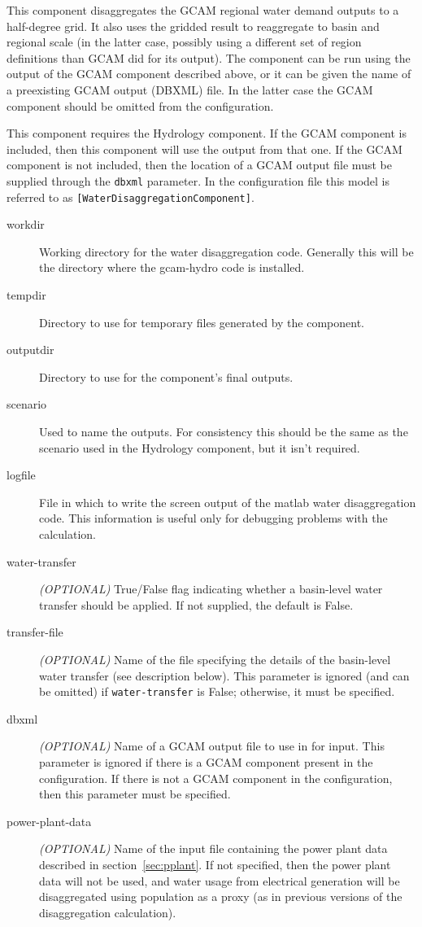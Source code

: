 \documentclass[11pt]{article}
\begin{document}
This component disaggregates the GCAM regional water demand outputs to a
half-degree grid.  It also uses the gridded result to reaggregate to
basin and regional scale (in the latter case, possibly using a
different set of region definitions than GCAM did for its output).
The component can be run using the output of the GCAM component described
above, or it can be given the name of a preexisting GCAM output
(DBXML) file.  In the latter case the GCAM component should be omitted
from the configuration.

This component requires the Hydrology component.  If the GCAM component is
included, then this component will use the output from that one.  If the
GCAM component is not included, then the location of a GCAM output file
must be supplied through the \texttt{dbxml} parameter.  In the
configuration file this model is referred to as
\texttt{[WaterDisaggregationComponent]}.

\begin{description}
\item[workdir] Working directory for the water disaggregation code.
  Generally this will be the directory where the gcam-hydro code is
  installed.
\item[tempdir] Directory to use for temporary files generated by the
  component.
\item[outputdir] Directory to use for the component's final outputs.
\item[scenario] Used to name the outputs.  For consistency this should
  be the same as the scenario used in the Hydrology component, but it
  isn't required.
\item[logfile] File in which to write the screen output of the matlab
  water disaggregation code.  This information is useful only for
  debugging problems with the calculation.
\item[water-transfer] \emph{(OPTIONAL)} True/False flag indicating
  whether a basin-level water transfer should be applied.  If not
  supplied, the default is False.
\item[transfer-file] \emph{(OPTIONAL)} Name of the file specifying the
  details of the basin-level water transfer (see description below).
  This parameter is ignored (and can be omitted) if
  \texttt{water-transfer} is False; otherwise, it must be specified.
\item[dbxml] \emph{(OPTIONAL)} Name of a GCAM output file to use in
  for input.  This parameter is ignored if there is a GCAM component
  present in the configuration.  If there is not a GCAM component in the
  configuration, then this parameter must be specified.
\item[power-plant-data] \emph{(OPTIONAL)} Name of the input file
  containing the power plant data described in
  section~\ref{sec:pplant}.  If not specified, then the power plant
  data will not be used, and water usage from electrical generation
  will be disaggregated using population as a proxy (as in previous
  versions of the disaggregation calculation).
\end{description}
\end{document}

